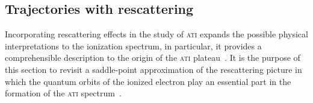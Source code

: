\subsection{\label{sec:spa_resc} Trajectories with rescattering}

Incorporating rescattering effects in the study of \textsc{ati}
expands the possible physical interpretations to the ionization
spectrum, in particular, it provides a comprehensible description to
the origin of the \textsc{ati}
plateau~\cite{Paulus_1994plateau,BeckerRescattering_2018}. It is the
purpose of this section to revisit a saddle-point approximation of the
rescattering picture in which the quantum orbits of the ionized
electron play an essential part in the formation of the \textsc{ati}
spectrum~\cite{KopoldOptComm2000}.

